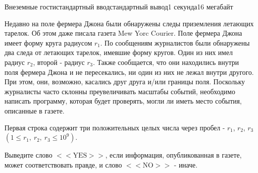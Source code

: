 \begin{problem}{Внеземные гости}{стандартный ввод}{стандартный вывод}{1 секунда}{16 мегабайт}

Недавно на поле фермера Джона были обнаружены следы приземления летающих тарелок. Об этом даже писала газета Mew Yorc Courier.
Поле фермера Джона имеет форму круга радиусом $r_1$. По сообщениям журналистов были обнаружены два следа от летающих тарелок, имевшие форму кругов. Один из них имел радиус $r_2$, второй - радиус $r_3$. Также сообщается, что они находились внутри поля фермера Джона и не пересекались, ни один из них не лежал внутри другого. При этом, они, возможно, касались друг друга и/или границы поля.
Поскольку журналисты часто склонны преувеличивать масштабы событий, необходимо написать программу, которая будет проверять, могли ли иметь место события, описанные в газете.

\InputFile
Первая строка содержит три положительных целых числа через пробел - $r_1$, $r_2$, $r_3$ $(1 \leq r_1,~r_2,~r_3 \leq 10^9)$.

\OutputFile
Выведите слово $<<\text{YES}>>$, если информация, опубликованная в газете, может соответствовать правде, и слово $<<\text{NO}>>$ - иначе.

\Examples

\begin{example}
%
%
\end{example}

\end{problem}


